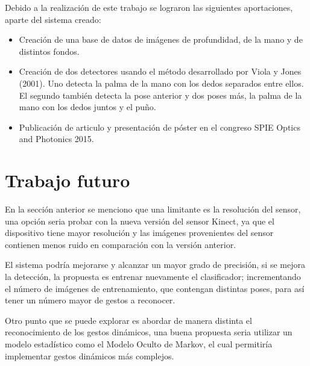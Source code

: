 Debido a la realización de este trabajo se lograron las siguientes aportaciones, aparte del sistema creado: 
 
\begin{itemize}
\item Creación de una base de datos de imágenes de profundidad, de la mano y de distintos fondos.   

\item Creación de dos detectores usando el método desarrollado por Viola y Jones (2001). Uno detecta la palma de la mano con los dedos separados entre ellos. El segundo también detecta la pose anterior y dos poses más, la palma de la mano con los dedos juntos y el puño. 

\item Publicación de articulo y presentación de póster en el congreso SPIE Optics and Photonics 2015.     

\end{itemize}


\section{Trabajo futuro}\label{futureWork}  

En la sección anterior se menciono que una limitante es la resolución del sensor, una opción seria probar con la nueva versión del sensor Kinect, ya que el dispositivo tiene mayor resolución y las imágenes provenientes del sensor contienen menos ruido en comparación con la versión anterior. 

El sistema podría mejorarse y alcanzar un mayor grado de precisión, si se mejora la detección, la propuesta es entrenar nuevamente el clasificador; incrementando el número de imágenes de entrenamiento, que contengan distintas poses, para así tener un número mayor de gestos a reconocer.

Otro punto que se puede explorar es abordar de manera distinta el reconocimiento de los gestos dinámicos, una buena propuesta seria utilizar un modelo estadístico como el Modelo Oculto de Markov, el cual permitiría implementar gestos dinámicos más complejos.  

\newpage
